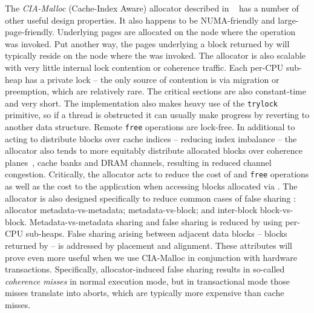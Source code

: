 \documentclass[preprint]{sigplanconf}
\begin{document}
The \emph{CIA-Malloc} (Cache-Index Aware) allocator described in ~\cite{ISMM11-Afek-CIA} 
has a number of other useful design properties. 
It also happens to be NUMA-friendly and large-page-friendly. Underlying pages are 
allocated on the node where the \malloc{} operation was invoked. Put another way, 
the pages underlying a block returned by \malloc{} will typically reside on the 
node where the \malloc{} was invoked. The allocator is also scalable with very 
little internal lock contention or coherence traffic. Each per-CPU sub-heap 
has a private lock -- the only source of contention is via migration 
or preemption, which are relatively rare. The critical sections are also 
constant-time and very short.  The implementation also makes heavy use of the \texttt{trylock} 
primitive, so if a thread is obstructed it can usually make progress by 
reverting to another data structure. Remote \texttt{free} operations are lock-free. 
In additional to acting to distribute blocks over cache indices -- reducing index
imbalance -- the allocator also tends to more equitably distribute allocated blocks 
over coherence planes~\cite{planes}, cache banks and DRAM channels, resulting in 
reduced channel congestion.  
Critically, the allocator acts to reduce the cost of \malloc{} and \texttt{free} 
operations as well as the cost to the application when accessing blocks allocated 
via \malloc{}. The allocator is also designed specifically to reduce common cases 
of false sharing : allocator metadata-vs-metadata; metadata-vs-block; and 
inter-block block-vs-block. Metadata-vs-metadata sharing and false sharing is 
reduced by using per-CPU sub-heaps. False sharing arising between adjacent 
data blocks -- blocks returned by \malloc{} -- is addressed by placement and alignment. 
These attributes will prove even more useful when we use CIA-Malloc in conjunction 
with hardware transactions.  Specifically, allocator-induced false sharing results in so-called
\emph{coherence misses} in normal execution mode, but in transactional mode those
misses translate into aborts, which are typically more expensive than cache misses.  
\end{document}
